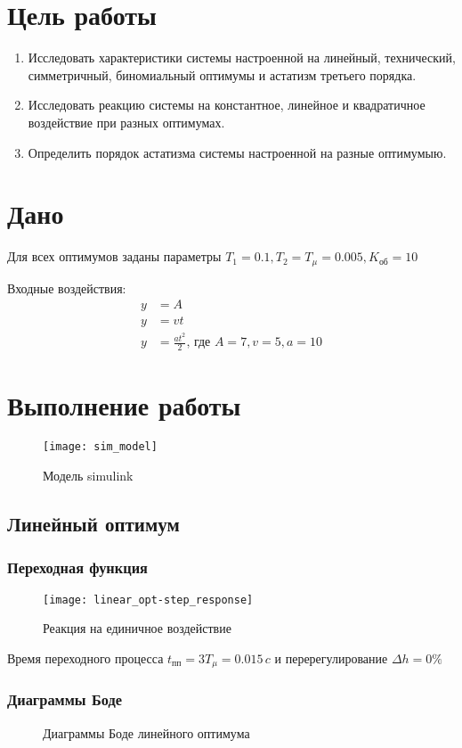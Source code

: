 


	
	\section{Цель работы}
		\begin{enumerate}
			\item Исследовать характеристики системы настроенной на линейный, технический, симметричный, биномиальный оптимумы и астатизм третьего порядка.
			\item Исследовать реакцию системы на константное, линейное и квадратичное воздействие при разных оптимумах.
            \item Определить порядок астатизма системы настроенной на разные оптимумыю.
		\end{enumerate}
	\section{Дано}
		Для всех оптимумов заданы параметры $T_1=0.1, T_2=T_{\mu}=0.005, K_{\text{об}}=10$
		
		Входные воздействия:
		\begin{align*}
			  y &= A\\
			  y &= vt\\
			  y &= \frac{at^2}{2}\mbox{, где } A = 7, v=5, a=10
		\end{align*}
	\section{Выполнение работы}
		\begin{figure}[H]
			\centering
			\texttt{[image: sim\_model]}
			\caption{Модель simulink}
		\end{figure}
		\subsection{Линейный оптимум}
			\subsubsection{Переходная функция}
				\begin{figure}[H]
					\centering
					\texttt{[image: linear\_opt-step\_response]}
					\caption{Реакция на единичное воздействие}
				\end{figure}
				Время переходного процесса $t_{\text{пп}}=3T_{\mu}=0.015\,c$ и перерегулирование $\Delta h=0\%$
			\subsubsection{Диаграммы Боде}
				\begin{figure}[H]
					\centering
					\caption{Диаграммы Боде линейного оптимума}
				\end{figure}
